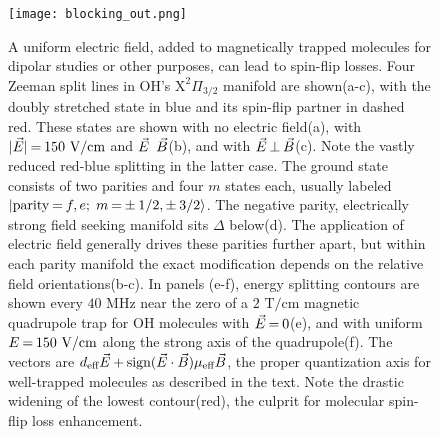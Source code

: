 \documentclass[%
 reprint,
 amsmath,amssymb,
 aps,
prl,
]{revtex4-1}
\newcommand{\epb}{{$\vec{E}\s {\perp}\s\vec{B}$}}
\newcommand{\s}{{\nobreak\hspace{.2em}}}
\begin{document}

\begin{figure}[tb]
\texttt{[image: blocking\_out.png]}%
\caption{
A uniform electric field, added to magnetically trapped molecules for dipolar studies or other purposes, can lead to spin-flip losses.
Four Zeeman split lines in OH's $\mathrm{X}^2\Pi_{3/2}$ manifold are shown\s(a-c), with the doubly stretched state in blue and its spin-flip partner in dashed red.
These states are shown with no electric field\s(a), with $|\vec{E}|\s {=}\s 150\text{ V/cm}$ and $\vec{E}\s $\protect\raisebox{1px}{${\parallel}$}$\s\vec{B}$\s(b), and with \epb{}\s(c).
Note the vastly reduced red-blue splitting in the latter case.
The ground state consists of two parities and four $m$ states each, usually labeled $|\text{parity}\s {=}\s f,e;\;m\s {=}\s{\pm}\s 1/2,{\pm}\s 3/2\rangle$.
The negative parity, electrically strong field seeking manifold sits $\Delta$ below\s(d).
The application of electric field generally drives these parities further apart, but within each parity manifold the exact modification depends on the relative field orientations\s(b-c).
In panels (e-f), energy splitting contours are shown every $40\text{ MHz}$ near the zero of a $2\text{ T/cm}$ magnetic quadrupole trap for OH molecules\s\cite{Stuhl2012uwave} with $\vec{E}\s {=}\s 0$\s(e), and with uniform $E\s {=}\s 150\text{ V/cm}$ along the strong axis of the quadrupole\s(f).
The vectors are $d_\text{eff}\vec{E}\s {+}\s\text{sign}(\vec{E}\cdot\vec{B})\mu_\text{eff}\vec{B}$, the proper quantization axis for well-trapped molecules as described in the text.
Note the drastic widening of the lowest contour\s(red), the culprit for molecular spin-flip loss enhancement.
}
\label{fig:blocking}
\end{figure}
\end{document}
